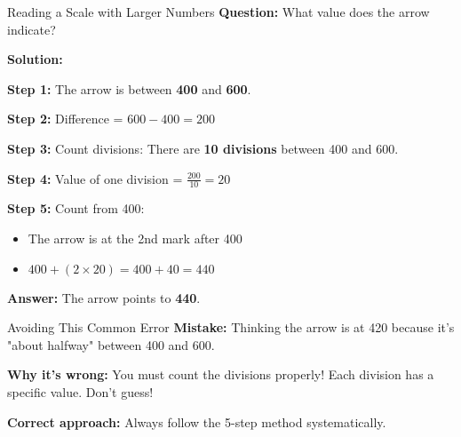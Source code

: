 \documentclass[12pt,a4paper]{article}
\begin{document}
\begin{examplebox}{Reading a Scale with Larger Numbers}
\textbf{Question:} What value does the arrow indicate?

\begin{center}
\end{center}

\textbf{Solution:}

\textbf{Step 1:} The arrow is between \textbf{400} and \textbf{600}.

\textbf{Step 2:} Difference = $600 - 400 = 200$

\textbf{Step 3:} Count divisions: There are \textbf{10 divisions} between 400 and 600.

\textbf{Step 4:} Value of one division = $\frac{200}{10} = 20$

\textbf{Step 5:} Count from 400:
\begin{itemize}
\item The arrow is at the 2nd mark after 400
\item $400 + (2 \times 20) = 400 + 40 = \boxed{440}$
\end{itemize}

\textbf{Answer:} The arrow points to \textbf{440}.
\end{examplebox}

\begin{warningbox}{Avoiding This Common Error}
\textbf{Mistake:} Thinking the arrow is at 420 because it's "about halfway" between 400 and 600.

\textbf{Why it's wrong:} You must count the divisions properly! Each division has a specific value. Don't guess!

\textbf{Correct approach:} Always follow the 5-step method systematically.
\end{warningbox}
\end{document}
